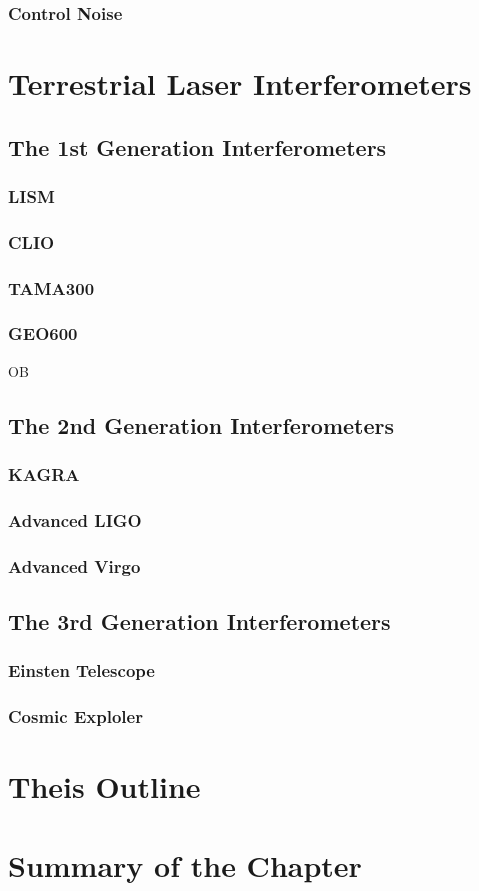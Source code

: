 \subsubsection{Control Noise}

\section{Terrestrial Laser Interferometers}
\subsection{The 1st Generation Interferometers}
\subsubsection{LISM}
\cite{sato2004ultrastable}
\subsubsection{CLIO}
\cite{agatsuma2010thermal}
\cite{ohashi2003design}
\subsubsection{TAMA300}
\cite{ando2001stable}
\subsubsection{GEO600}
OB
\subsection{The 2nd Generation Interferometers}
\subsubsection{KAGRA}
\subsubsection{Advanced LIGO}
\subsubsection{Advanced Virgo}
\subsection{The 3rd Generation Interferometers}
\subsubsection{Einsten Telescope}
\subsubsection{Cosmic Exploler}
\section{Theis Outline}

\section{Summary of the Chapter}
